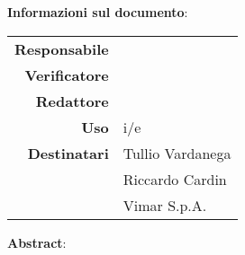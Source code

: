 \begin{center}
\textbf{Informazioni sul documento}: \\
\vspace{0.5cm}

\begin{tabular}{r|l}
    \textbf{Responsabile} &  \\ 
    \textbf{Verificatore} &  \\ 
    \textbf{Redattore} &     \\ 
    \textbf{Uso} & i/e \\ 
    \textbf{Destinatari} & Tullio Vardanega \\ & Riccardo Cardin \\ & Vimar S.p.A.
\end{tabular}

\vfill

\textbf{Abstract}: \\
\vspace{0.5cm}

\end{center}


\bigskip